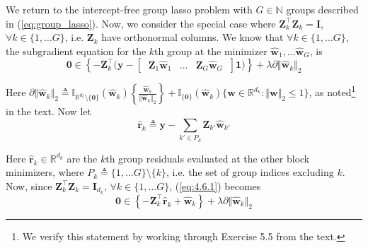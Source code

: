 \documentclass{article}
\numberwithin{equation}{section}
\begin{document}
 \label{sec:4.6}

We return to the intercept-free group lasso problem with $ G \in \mathbb{N} $
groups described in (\ref{eq:group_lasso}). Now, we consider the special case
where $ \mathbf{Z}_k^\top\mathbf{Z}_k = \mathbf{I} $,
$ \forall k \in \{1, \ldots G\} $, i.e. $ \mathbf{Z}_k $ have orthonormal
columns. We know that $ \forall k \in \{1, \ldots G\} $, the subgradient
equation for the $ k $th group at the minimizer
$ \hat{\mathbf{w}}_1, \ldots \hat{\mathbf{w}}_G $, is
\begin{equation} \label{eq:4.6.1}
    \mathbf{0} \in
    \left\{
        -\mathbf{Z}_k^\top
        \big(
            \mathbf{y} -
            \begin{bmatrix}
                \ \mathbf{Z}_1\hat{\mathbf{w}}_1 &
                \ldots &
                \mathbf{Z}_G\hat{\mathbf{w}}_G \
            \end{bmatrix}
            \mathbf{1}
        \big)
    \right\} +
    \lambda\partial\Vert\hat{\mathbf{w}}_k\Vert_2
\end{equation}

Here $ \partial\Vert\hat{\mathbf{w}}_k\Vert_2 \triangleq
\mathbb{I}_{\mathbb{R}^{d_k} \setminus \{\mathbf{0}\}}(\hat{\mathbf{w}}_k)
\left\{\frac{\hat{\mathbf{w}}_k}{\Vert\hat{\mathbf{w}}_k\Vert_2}\right\} +
\mathbb{I}_{\{\mathbf{0}\}}(\hat{\mathbf{w}}_k)
\{\mathbf{w} \in \mathbb{R}^{d_k} : \Vert\mathbf{w}\Vert_2 \le 1\} $, as
noted\footnote{
    We verify this statement by working through Exercise 5.5 from the text.
} in the text. Now let
\begin{equation} \label{eq:4.6.2}
    \hat{\mathbf{r}}_k \triangleq
    \mathbf{y} - \sum_{k' \in P_k}\mathbf{Z}_{k'}\hat{\mathbf{w}}_{k'}
\end{equation}

Here $ \hat{\mathbf{r}}_k \in \mathbb{R}^{d_k} $ are the $ k $th group
residuals evaluated at the other block minimizers, where
$ P_k \triangleq \{1, \ldots G\} \setminus \{k\} $, i.e. the set of group
indices excluding $ k $. Now, since
$ \mathbf{Z}_k^\top\mathbf{Z}_k = \mathbf{I}_{d_k} $,
$ \forall k \in \{1, \ldots G\} $, (\ref{eq:4.6.1}) becomes
\begin{equation} \label{eq:4.6.3}
    \mathbf{0} \in
    \left\{
        -\mathbf{Z}_k^\top\hat{\mathbf{r}}_k + \hat{\mathbf{w}}_k
    \right\} +
    \lambda\partial\Vert\hat{\mathbf{w}}_k\Vert_2
\end{equation}
\end{document}

